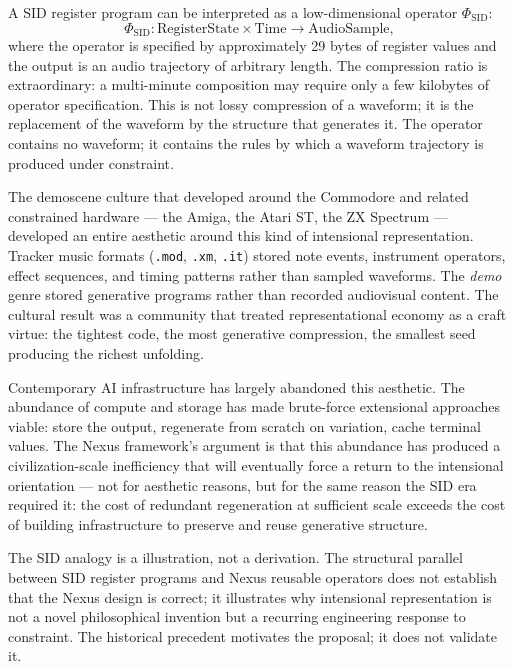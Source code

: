 \begin{technote}
A SID register program can be interpreted as a
low-dimensional operator $\Phi_{\mathrm{SID}}$:
\[
  \Phi_{\mathrm{SID}} : \text{RegisterState}
  \times \text{Time} \to \text{AudioSample},
\]
where the operator is specified by approximately
29 bytes of register values and the output is an
audio trajectory of arbitrary length. The compression
ratio is extraordinary: a multi-minute composition
may require only a few kilobytes of operator specification.
This is not lossy compression of a waveform; it is
the replacement of the waveform by the structure that
generates it. The operator contains no waveform;
it contains the rules by which a waveform trajectory
is produced under constraint.
\end{technote}

The demoscene culture that developed around the
Commodore and related constrained hardware --- the
Amiga, the Atari ST, the ZX Spectrum --- developed
an entire aesthetic around this kind of intensional
representation. Tracker music formats (\texttt{.mod},
\texttt{.xm}, \texttt{.it}) stored note events,
instrument operators, effect sequences, and timing
patterns rather than sampled waveforms. The \emph{demo}
genre stored generative programs rather than recorded
audiovisual content. The cultural result was a community
that treated representational economy as a craft virtue:
the tightest code, the most generative compression,
the smallest seed producing the richest unfolding.

Contemporary AI infrastructure has largely abandoned
this aesthetic. The abundance of compute and storage
has made brute-force extensional approaches viable:
store the output, regenerate from scratch on variation,
cache terminal values. The Nexus framework's argument
is that this abundance has produced a civilization-scale
inefficiency that will eventually force a return to
the intensional orientation --- not for aesthetic
reasons, but for the same reason the SID era required
it: the cost of redundant regeneration at sufficient
scale exceeds the cost of building infrastructure
to preserve and reuse generative structure.

\begin{dangerzone}
The SID analogy is a \LevelII{} illustration, not
a \LevelI{} derivation. The structural parallel between
SID register programs and Nexus reusable operators
does not establish that the Nexus design is correct;
it illustrates why intensional representation is not
a novel philosophical invention but a recurring
engineering response to constraint. The historical
precedent motivates the proposal; it does not validate it.
\end{dangerzone}

